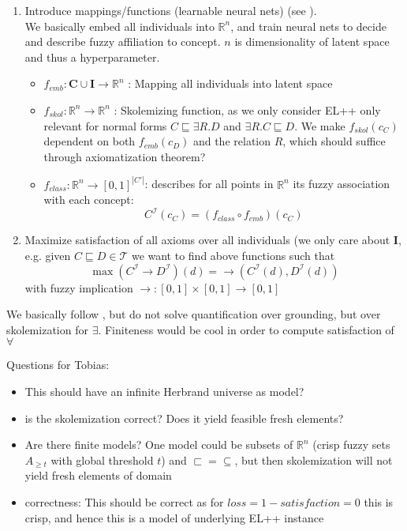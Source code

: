 \documentclass[]{article}
\begin{document}
\begin{enumerate}
      \item Introduce mappings/functions (learnable neural nets) (see \cite{LTN}).\\
	We basically embed all individuals into $\mathbb{R}^n$, and train neural nets to decide and describe fuzzy affiliation to concept. $n$ is dimensionality of latent space and thus a hyperparameter.
	\begin{itemize}
		\item $f_{emb}:\mathbf{C}\cup \mathbf{I}\rightarrow\mathbb{R}^n$ : Mapping all individuals into latent space
		\item $f_{skol}:\mathbb{R}^n\rightarrow\mathbb{R}^n$ : Skolemizing function, as we only consider EL++ only relevant for normal forms $C\sqsubseteq\exists R.D$ and $\exists R.C\sqsubseteq D$. We make $f_{skol}(c_C)$ dependent on both $f_{emb}(c_D)$ and the relation $R$, which should suffice through axiomatization theorem?
		\item $f_{class}:\mathbb{R}^n\rightarrow [0,1]^{|C'|}$: describes for all points in $\mathbb{R}^n$ its fuzzy association with each concept:
		\begin{equation*}
			C^\mathcal{I}(c_C)=(f_{class} \circ f_{emb})(c_C)
		\end{equation*}
	\end{itemize}
	\item Maximize satisfaction of all axioms over all individuals (we only care about $\mathbf{I}$, e.g. given $C\sqsubseteq D\in \mathcal{T}$ we want to find above functions such that
	\begin{equation}
		\max (C^\mathcal{I} \rightarrow D^\mathcal{I})(d) = \rightarrow (C^\mathcal{I}(d), D^\mathcal{I}(d))
	\end{equation}
	with fuzzy implication $\rightarrow:[0,1] \times [0,1]\rightarrow [0,1]$
	
\end{enumerate}
We basically follow \cite{LTN}, but do not solve quantification over grounding, but over skolemization for $\exists$. Finiteness would be cool in order to compute satisfaction of $\forall$ 

Questions for Tobias:
\begin{itemize}
	\item This should have an infinite Herbrand universe as model?
	\item is the skolemization correct? Does it yield feasible fresh elements?
	\item Are there finite models? One model could be subsets of $\mathbb{R}^n$ (crisp fuzzy sets $A_{\geq t}$ with global threshold $t$) and $\sqsubset = \subseteq$, but then skolemization will not yield fresh elements of domain
	\item correctness: This should be correct as for $ loss = 1-satisfaction = 0$ this is crisp, and hence this is a model of underlying EL++ instance
\end{itemize}
\end{document}
